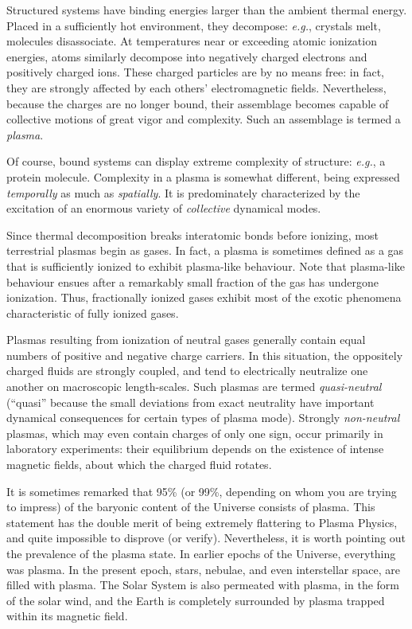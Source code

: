 Structured systems have binding energies larger than the ambient thermal
energy. Placed in a sufficiently hot environment, they decompose: {\em e.g.},
crystals melt, molecules disassociate. At temperatures near or exceeding
atomic ionization energies,  atoms similarly decompose into
negatively charged electrons and positively charged ions. These charged
particles are by no means free: in fact, they are strongly
affected by each others' electromagnetic fields. Nevertheless, because
the charges are no longer bound, their assemblage becomes
capable of collective motions of great vigor and complexity. Such
an assemblage is termed a {\em plasma}. 

Of course, bound systems can display extreme complexity of
structure: {\em e.g.}, a protein molecule. Complexity in a plasma
is somewhat different, being expressed {\em temporally}\/ as much as
{\em spatially}. It is predominately characterized by the
excitation of an enormous variety of {\em collective}\/ dynamical modes.

Since thermal decomposition breaks interatomic bonds before ionizing,
most terrestrial  plasmas begin as gases. In fact, a plasma is sometimes
defined as a gas that is sufficiently ionized to exhibit plasma-like
behaviour. Note that plasma-like behaviour  ensues after a remarkably
small fraction of the gas has undergone ionization. Thus, fractionally
ionized gases exhibit most of the exotic phenomena characteristic of
fully ionized gases. 

Plasmas resulting from ionization of neutral gases generally contain equal numbers
of positive and negative charge carriers. In this situation, the
oppositely charged fluids are strongly coupled, and tend to electrically   neutralize
one another  on macroscopic length-scales. Such plasmas
are termed {\em quasi-neutral}\/ (``quasi'' because the small deviations
from exact neutrality  have important dynamical consequences for certain types
of plasma mode). Strongly {\em non-neutral}\/ plasmas, which may even
contain charges of only one sign, occur primarily in laboratory experiments:
their equilibrium depends on the existence of intense magnetic fields,
about which the charged fluid rotates. 

It is sometimes remarked that 95\% (or 99\%, depending on whom you are
trying to impress) of the baryonic content of the Universe consists of plasma. This statement has the
double merit of being extremely  flattering to Plasma Physics, and
quite  impossible to disprove (or verify). Nevertheless, it is worth
 pointing out the prevalence of the plasma state. In earlier epochs
of the Universe, everything was plasma. In the present epoch, stars, nebulae,
and even interstellar space, are filled with plasma. The Solar System
is also permeated  with plasma, in the form of the solar wind, and the
Earth is completely surrounded by plasma trapped within its magnetic field. 

